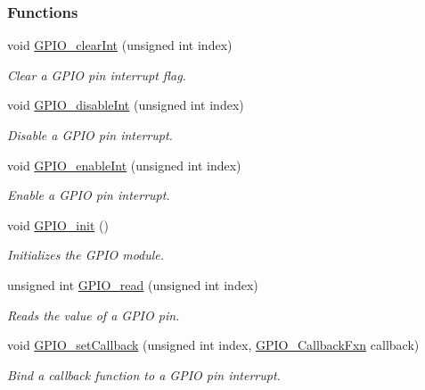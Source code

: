 \subsubsection*{Functions}
\begin{DoxyCompactItemize}
\item 
void \hyperlink{_g_p_i_o_8h_ad890aa2518ec2f4c88419dc4036b6197}{G\+P\+I\+O\+\_\+clear\+Int} (unsigned int index)
\begin{DoxyCompactList}\small\item\em Clear a G\+P\+I\+O pin interrupt flag. \end{DoxyCompactList}\item 
void \hyperlink{_g_p_i_o_8h_a37f548f4dabd9ee12e3ba4805ce1680e}{G\+P\+I\+O\+\_\+disable\+Int} (unsigned int index)
\begin{DoxyCompactList}\small\item\em Disable a G\+P\+I\+O pin interrupt. \end{DoxyCompactList}\item 
void \hyperlink{_g_p_i_o_8h_a3192dd50a71f491f45bb8c5d4ba384dc}{G\+P\+I\+O\+\_\+enable\+Int} (unsigned int index)
\begin{DoxyCompactList}\small\item\em Enable a G\+P\+I\+O pin interrupt. \end{DoxyCompactList}\item 
void \hyperlink{_g_p_i_o_8h_a7aaec489dca5ac4d278d2eb3ae38a2d2}{G\+P\+I\+O\+\_\+init} ()
\begin{DoxyCompactList}\small\item\em Initializes the G\+P\+I\+O module. \end{DoxyCompactList}\item 
unsigned int \hyperlink{_g_p_i_o_8h_a200db4ea3141abfc9c9a6ca202c2e2e4}{G\+P\+I\+O\+\_\+read} (unsigned int index)
\begin{DoxyCompactList}\small\item\em Reads the value of a G\+P\+I\+O pin. \end{DoxyCompactList}\item 
void \hyperlink{_g_p_i_o_8h_adde3a4e1f73a9c9971f91e17d75a2e86}{G\+P\+I\+O\+\_\+set\+Callback} (unsigned int index, \hyperlink{_g_p_i_o_8h_a7814871ec922ed619c98b8e8c323372c}{G\+P\+I\+O\+\_\+\+Callback\+Fxn} callback)
\begin{DoxyCompactList}\small\item\em Bind a callback function to a G\+P\+I\+O pin interrupt. \end{DoxyCompactList}\item 

\end{DoxyCompactItemize}
